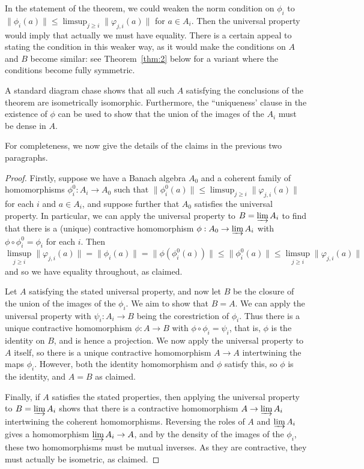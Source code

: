 \documentclass[a4paper,11pt]{article}
\newcommand{\indlim}{\varinjlim}
\theoremstyle{definition}
\begin{document}
In the statement of the theorem, we could weaken the norm condition on $\phi_i$ to
$\|\phi_i(a)\| \leq \limsup_{j\geq i} \|\varphi_{j,i}(a)\|$ for $a\in A_i$.  Then the universal
property would imply that actually we must have equality.  There is a certain appeal to stating the
condition in this weaker way, as it would make the conditions on $A$ and $B$ become similar: see
Theorem~\ref{thm:2} below for a variant where the conditions become fully symmetric.

A standard diagram chase shows that all such $A$ satisfying the conclusions of the theorem are
isometrically isomorphic.  Furthermore, the ``uniqueness' clause in the existence of $\phi$ can be
used to show that the union of the images of the $A_i$ must be dense in $A$.

For completeness, we now give the details of the claims in the previous two paragraphs.

\begin{proof}
Firstly, suppose we have a Banach algebra $A_0$ and a coherent family of homomorphisms $\phi_i^0:A_i
\rightarrow A_0$ such that $\|\phi_i^0(a)\| \leq \limsup_{j\geq i} \|\varphi_{j,i}(a)\|$ for each
$i$ and $a\in A_i$, and suppose further that $A_0$ satisfies the universal property.  In particular,
we can apply the universal property to $B=\indlim A_i$ to find that there is a (unique) contractive
homomorphism $\phi:A_0 \rightarrow \indlim A_i$ with $\phi\circ\phi_i^0 = \phi_i$ for each $i$.
Then
\[ \limsup_{j\geq i} \|\varphi_{j,i}(a)\| = \|\phi_i(a)\| = \|\phi(\phi_i^0(a))\|
\leq \|\phi_i^0(a)\| \leq \limsup_{j\geq i} \|\varphi_{j,i}(a)\| \]
and so we have equality throughout, as claimed.

Let $A$ satisfying the stated universal property, and now let $B$ be the closure of the union of
the images of the $\phi_i$.  We aim to show that $B=A$.  We can apply the universal property with
$\psi_i:A_i\rightarrow B$ being the corestriction of $\phi_i$.  Thus there is a unique contractive
homomorphism $\phi:A\rightarrow B$ with $\phi\circ\phi_i = \psi_i$, that is, $\phi$ is the identity
on $B$, and is hence a projection.  We now apply the universal property to $A$ itself, so there
is a unique contractive homomorphism $A\rightarrow A$ intertwining the maps $\phi_i$.  However,
both the identity homomorphism and $\phi$ satisfy this, so $\phi$ is the identity, and $A=B$ as
claimed.

Finally, if $A$ satisfies the stated properties, then applying the universal property to
$B = \indlim A_i$ shows that there is a contractive homomorphism $A\rightarrow\indlim A_i$
intertwining the coherent homomorphisms.  Reversing the roles of $A$ and $\indlim A_i$ gives
a homomorphism $\indlim A_i \rightarrow A$, and by the density of the images of the $\phi_i$,
these two homomorphisms must be mutual inverses.  As they are contractive, they must actually
be isometric, as claimed.
\end{proof}
\end{document}
